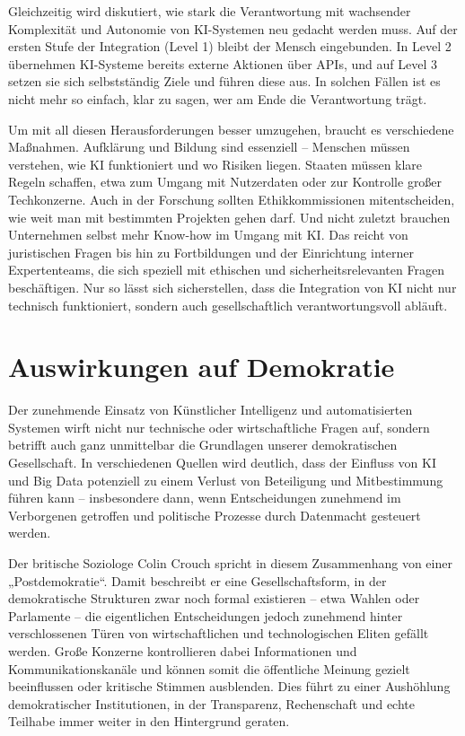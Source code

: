 \documentclass[utf8,biblatex]{bremerhaven_lni}
\begin{document}
Gleichzeitig wird diskutiert, wie stark die Verantwortung mit wachsender Komplexität und Autonomie von KI-Systemen neu gedacht werden muss. Auf der ersten Stufe der Integration (Level 1) bleibt der Mensch eingebunden. In Level 2 übernehmen KI-Systeme bereits externe Aktionen über APIs, und auf Level 3 setzen sie sich selbstständig Ziele und führen diese aus. In solchen Fällen ist es nicht mehr so einfach, klar zu sagen, wer am Ende die Verantwortung trägt.

Um mit all diesen Herausforderungen besser umzugehen, braucht es verschiedene Maßnahmen. Aufklärung und Bildung sind essenziell – Menschen müssen verstehen, wie KI funktioniert und wo Risiken liegen. Staaten müssen klare Regeln schaffen, etwa zum Umgang mit Nutzerdaten oder zur Kontrolle großer Techkonzerne. Auch in der Forschung sollten Ethikkommissionen mitentscheiden, wie weit man mit bestimmten Projekten gehen darf. Und nicht zuletzt brauchen Unternehmen selbst mehr Know-how im Umgang mit KI. Das reicht von juristischen Fragen bis hin zu Fortbildungen und der Einrichtung interner Expertenteams, die sich speziell mit ethischen und sicherheitsrelevanten Fragen beschäftigen. Nur so lässt sich sicherstellen, dass die Integration von KI nicht nur technisch funktioniert, sondern auch gesellschaftlich verantwortungsvoll abläuft.

\section{Auswirkungen auf Demokratie}

Der zunehmende Einsatz von Künstlicher Intelligenz und automatisierten Systemen wirft nicht nur technische oder wirtschaftliche Fragen auf, sondern betrifft auch ganz unmittelbar die Grundlagen unserer demokratischen Gesellschaft. In verschiedenen Quellen wird deutlich, dass der Einfluss von KI und Big Data potenziell zu einem Verlust von Beteiligung und Mitbestimmung führen kann – insbesondere dann, wenn Entscheidungen zunehmend im Verborgenen getroffen und politische Prozesse durch Datenmacht gesteuert werden.

Der britische Soziologe Colin Crouch spricht in diesem Zusammenhang von einer „Postdemokratie“. Damit beschreibt er eine Gesellschaftsform, in der demokratische Strukturen zwar noch formal existieren – etwa Wahlen oder Parlamente – die eigentlichen Entscheidungen jedoch zunehmend hinter verschlossenen Türen von wirtschaftlichen und technologischen Eliten gefällt werden. Große Konzerne kontrollieren dabei Informationen und Kommunikationskanäle und können somit die öffentliche Meinung gezielt beeinflussen oder kritische Stimmen ausblenden. Dies führt zu einer Aushöhlung demokratischer Institutionen, in der Transparenz, Rechenschaft und echte Teilhabe immer weiter in den Hintergrund geraten.
\end{document}

